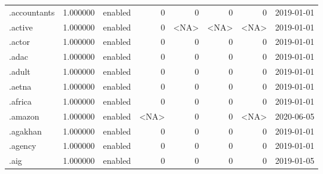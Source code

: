 \begin{tabular}{lrlrrrrl}
.accountants              &          1.000000 &         enabled &                           0 &                           0 &                           0 &                   0 &           2019-01-01 \\
.active                   &          1.000000 &         enabled &                           0 &                        <NA> &                        <NA> &                <NA> &           2019-01-01 \\
.actor                    &          1.000000 &         enabled &                           0 &                           0 &                           0 &                   0 &           2019-01-01 \\
.adac                     &          1.000000 &         enabled &                           0 &                           0 &                           0 &                   0 &           2019-01-01 \\
.adult                    &          1.000000 &         enabled &                           0 &                           0 &                           0 &                   0 &           2019-01-01 \\
.aetna                    &          1.000000 &         enabled &                           0 &                           0 &                           0 &                   0 &           2019-01-01 \\
.africa                   &          1.000000 &         enabled &                           0 &                           0 &                           0 &                   0 &           2019-01-01 \\
.amazon                   &          1.000000 &         enabled &                        <NA> &                           0 &                           0 &                <NA> &           2020-06-05 \\
.agakhan                  &          1.000000 &         enabled &                           0 &                           0 &                           0 &                   0 &           2019-01-01 \\
.agency                   &          1.000000 &         enabled &                           0 &                           0 &                           0 &                   0 &           2019-01-01 \\
.aig                      &          1.000000 &         enabled &                           0 &                           0 &                           0 &                   0 &           2019-01-05 \\

\end{tabular}
